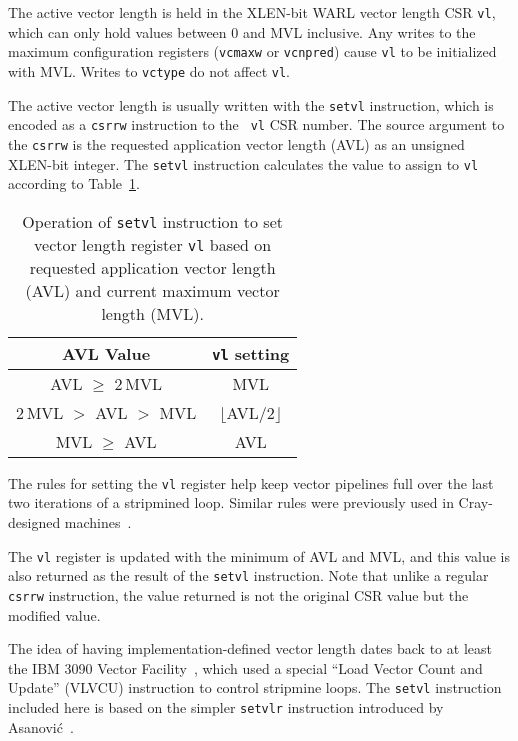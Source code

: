 The active vector length is held in the XLEN-bit WARL vector length
CSR {\tt vl}, which can only hold values between 0 and MVL inclusive.
Any writes to the maximum configuration registers ({\tt vcmaxw} or
{\tt vcnpred}) cause {\tt vl} to be initialized with MVL.  Writes to
{\tt vctype} do not affect {\tt vl}.

The active vector length is usually written with the {\tt setvl}
instruction, which is encoded as a {\tt csrrw} instruction to the {\tt
  vl} CSR number.  The source argument to the {\tt csrrw} is the
requested application vector length (AVL) as an unsigned XLEN-bit
integer. The {\tt setvl} instruction calculates the value to assign to
{\tt vl} according to Table~\ref{tab:vlcalc}.

\begin{table}
  \centering
  \begin{tabular}{|c|c|}
    \hline
    AVL Value & {\tt vl} setting \\
    \hline
    AVL $\geq$ 2\,MVL & MVL \\
    2\,MVL $>$ AVL $>$ MVL & $\lfloor$AVL$/2\rfloor$ \\
    MVL $\geq$ AVL & AVL \\
    \hline
  \end{tabular}
  \caption{Operation of {\tt setvl} instruction to set vector
    length register {\tt vl} based on requested application vector
    length (AVL) and current maximum vector length (MVL).}
  \label{tab:vlcalc}
\end{table}

\begin{commentary}
  The rules for setting the {\tt vl} register help keep vector
  pipelines full over the last two iterations of a stripmined loop.
  Similar rules were previously used in Cray-designed machines~\cite{crayx1asm}.
\end{commentary}

The {\tt vl} register is updated with the minimum of AVL and
MVL, and this value is also returned as the result of the {\tt setvl}
instruction.  Note that unlike a regular {\tt csrrw} instruction, the
value returned is not the original CSR value but the modified value.

\begin{commentary}
  The idea of having implementation-defined vector length dates back
  to at least the IBM 3090 Vector Facility~\cite{ibm370varch}, which
  used a special ``Load Vector Count and Update'' (VLVCU) instruction
  to control stripmine loops.  The {\tt setvl} instruction included
  here is based on the simpler {\tt setvlr} instruction introduced by
  Asanovi\'{c}~\cite{krstephd}.
\end{commentary}

